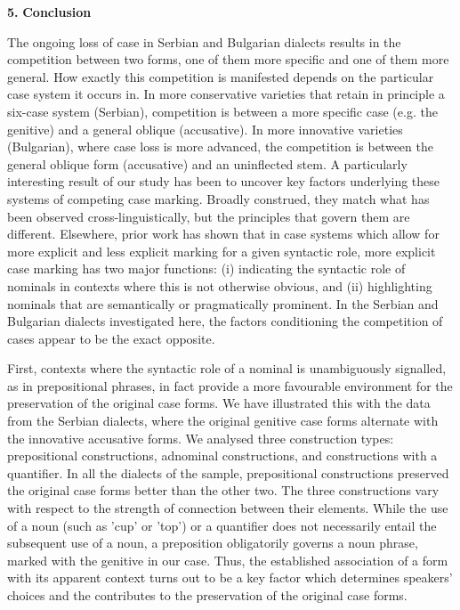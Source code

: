 \documentclass[output=paper]{langscibook}
\begin{document}
\textbf{5.} \textbf{Conclusion} 

\begin{stylexelementtoproof}
The ongoing loss of case in Serbian and Bulgarian dialects results in the competition between two forms, one of them more specific and one of them more general. How exactly this competition is manifested depends on the particular case system it occurs in. In more conservative varieties that retain in principle a six-case system (Serbian), competition is between a more specific case (e.g. the genitive) and a general oblique (accusative). In more innovative varieties (Bulgarian), where case loss is more advanced, the competition is between the general oblique form (accusative) and an uninflected stem. A particularly interesting result of our study has been to uncover key factors underlying these systems of competing case marking. Broadly construed, they match what has been observed cross-linguistically, but the principles that govern them are different.  Elsewhere, prior work has shown that in case systems which allow for more explicit and less explicit marking for a given syntactic role, more explicit case marking has two major functions: (i) indicating the syntactic role of nominals in contexts where this is not otherwise obvious, and (ii) highlighting nominals that are semantically or pragmatically prominent. In the Serbian and Bulgarian dialects investigated here, the factors conditioning the competition of cases appear to be the exact opposite. 
\end{stylexelementtoproof}

\begin{stylexelementtoproof}
First, contexts where the syntactic role of a nominal is unambiguously signalled, as in prepositional phrases, in fact provide a more favourable environment for the preservation of the original case forms. We have illustrated this with the data from the Serbian dialects, where the original genitive case forms alternate with the innovative accusative forms. We analysed three construction types: prepositional constructions, adnominal constructions, and constructions with a quantifier. In all the dialects of the sample, prepositional constructions preserved the original case forms better than the other two. The three constructions vary with respect to the strength of connection between their elements. While the use of a noun (such as 'cup' or 'top') or a quantifier does not necessarily entail the subsequent use of a noun, a preposition obligatorily governs a noun phrase, marked with the genitive in our case. Thus, the established association of a form with its apparent context turns out to be a key factor which determines speakers’ choices and the contributes to the preservation of the original case forms. 
\end{stylexelementtoproof}
\end{document}
